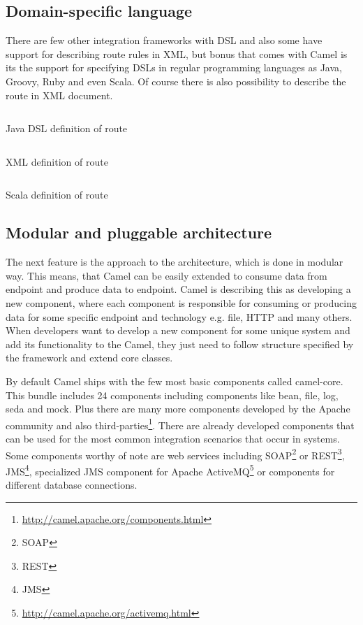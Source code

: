 \documentclass[12pt,final,oneside]{fithesis2}
\begin{document}
\subsection*{Domain-specific language}
There are few other integration frameworks with DSL and also some have support for describing route rules in XML, but bonus that comes with Camel is its the support for specifying DSLs in regular programming languages as Java, Groovy, Ruby and even Scala. Of course there is also possibility to describe the route in XML document. 

\begin{listing}[ht]
	\inputminted[]{java}{sources/java_dsl_example.java}
	\caption{Java DSL definition of route}

\end{listing}

\begin{listing}[ht]
	\inputminted[]{xml}{sources/xml_example.xml}
	\caption{XML definition of route }

\end{listing}

\begin{listing}[ht, p!]
	\inputminted[]{java}{sources/scala_example.java}
	\caption{Scala definition of route }

\end{listing}


\subsection*{Modular and pluggable architecture}
The next feature is the approach to the architecture, which is done in modular way. This means, that Camel can be easily extended to consume data from endpoint and produce data to endpoint. Camel is describing this as developing a new component, where each component is responsible for consuming or producing data for some specific endpoint and technology e.g. file, HTTP and many others. When developers want to develop a new component for some unique system and add its functionality to the Camel, they just need to follow structure specified by the framework and extend core classes. 

By default Camel ships with the few most basic components called camel-core. This bundle includes 24 components including components like bean, file, log, seda and mock. Plus there are many more components developed by the Apache community and also third-parties\footnote{\url{http://camel.apache.org/components.html}}. There are already developed components that can be used for the most common integration scenarios that occur in systems. Some components worthy of note are web services including SOAP\footnote{SOAP} or REST\footnote{REST}, JMS\footnote{JMS}, specialized JMS component for Apache ActiveMQ\footnote{\url{http://camel.apache.org/activemq.html}} or components for different database connections.
\end{document}
